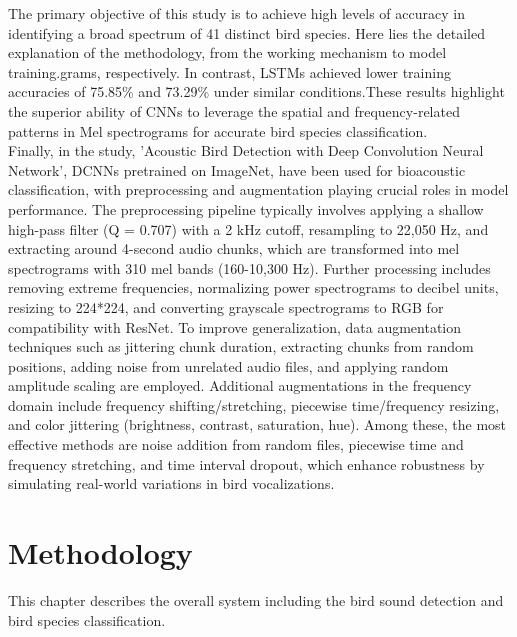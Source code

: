 The primary objective of this study is to achieve high levels of accuracy in
identifying a broad spectrum of 41 distinct bird species. Here lies the
detailed explanation of the methodology, from the working mechanism to model
training.grams, respectively. In contrast, LSTMs achieved lower training
accuracies of 75.85\% and 73.29\% under similar conditions.These results
highlight the superior ability of CNNs to leverage the spatial and
frequency-related patterns in Mel spectrograms for accurate bird species
classification.\\

Finally, in the study\cite{lasseck2018acoustic}, 'Acoustic Bird Detection with
Deep Convolution Neural Network', DCNNs pretrained on ImageNet, have been used
for bioacoustic classification, with preprocessing and augmentation playing
crucial roles in model performance. The preprocessing pipeline typically
involves applying a shallow high-pass filter (Q = 0.707) with a 2 kHz cutoff,
resampling to 22,050 Hz, and extracting around 4-second audio chunks, which are
transformed into mel spectrograms with 310 mel bands (160-10,300 Hz). Further
processing includes removing extreme frequencies, normalizing power
spectrograms to decibel units, resizing to 224*224, and converting grayscale
spectrograms to RGB for compatibility with ResNet. To improve generalization,
data augmentation techniques such as jittering chunk duration, extracting
chunks from random positions, adding noise from unrelated audio files, and
applying random amplitude scaling are employed. Additional augmentations in the
frequency domain include frequency shifting/stretching, piecewise
time/frequency resizing, and color jittering (brightness, contrast, saturation,
hue). Among these, the most effective methods are noise addition from random
files, piecewise time and frequency stretching, and time interval dropout,
which enhance robustness by simulating real-world variations in bird
vocalizations.\\

\newpage

\chapter{Methodology}
This chapter describes the overall system including the bird sound detection
and bird species classification.

